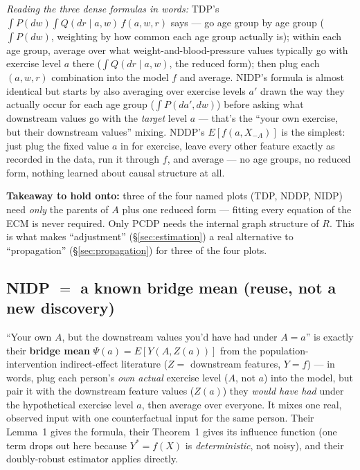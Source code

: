\emph{Reading the three dense formulas in words:} TDP's
$\int P(dw) \int Q(dr\mid a,w)\, f(a,w,r)$ says --- go age group by age
group ($\int P(dw)$, weighting by how common each age group actually is);
within each age group, average over what weight-and-blood-pressure values
typically go with exercise level $a$ there ($\int Q(dr\mid a,w)$, the
reduced form); then plug each $(a,w,r)$ combination into the model $f$ and
average. NIDP's formula is almost identical but starts by also averaging
over exercise levels $a'$ drawn the way they actually occur for each age
group ($\int P(da',dw)$) before asking what downstream values go with the
\emph{target} level $a$ --- that's the ``your own exercise, but their
downstream values'' mixing. NDDP's $E[f(a,X_{-A})]$ is the simplest: just
plug the fixed value $a$ in for exercise, leave every other feature exactly
as recorded in the data, run it through $f$, and average --- no age
groups, no reduced form, nothing learned about causal structure at all.

\textbf{Takeaway to hold onto:} three of the four named plots (TDP, NDDP,
NIDP) need \emph{only} the parents of $A$ plus one reduced form --- fitting
every equation of the ECM is never required. Only PCDP needs the internal
graph structure of $R$. This is what makes ``adjustment''
(\S\ref{sec:estimation}) a real alternative to ``propagation''
(\S\ref{sec:propagation}) for three of the four plots.

\subsection{NIDP \texorpdfstring{$=$}{=} a known bridge mean (reuse, not a new discovery)}

``Your own $A$, but the downstream values you'd have had under $A=a$'' is
exactly their \textbf{bridge mean} $\Psi(a) = E[Y(A, Z(a))]$ from the
population-intervention indirect-effect literature ($Z=$ downstream
features, $Y=f$) --- in words, plug each person's \emph{own actual}
exercise level ($A$, not $a$) into the model, but pair it with the
downstream feature values ($Z(a)$) they \emph{would have had} under the
hypothetical exercise level $a$, then average over everyone. It mixes one
real, observed input with one counterfactual input for the same person.
Their Lemma~1 gives the formula, their Theorem~1 gives its
influence function (one term drops out here because $Y^*=f(X)$ is
\emph{deterministic}, not noisy), and their doubly-robust estimator applies
directly.

